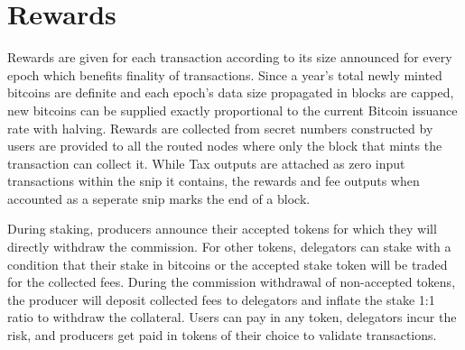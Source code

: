 \documentclass[a4paper,10pt]{article}
\begin{document}
\section{Rewards}

Rewards are given for each transaction according to its size  announced for every epoch which benefits finality of transactions. Since a year's total newly minted bitcoins are definite and each epoch's data size propagated in blocks are capped, new bitcoins can be supplied exactly proportional to the current Bitcoin issuance rate with halving. Rewards are collected from secret numbers constructed by users are provided to all the routed nodes where only the block that mints the transaction can collect it. While Tax outputs are attached as zero input transactions within the snip it contains, the rewards and fee outputs when accounted as a seperate snip marks the end of a block. 

During staking, producers announce their accepted tokens for which they will directly withdraw the commission. For other tokens, delegators can stake with a condition that their stake in bitcoins or the accepted stake token will be traded for the collected fees. During the commission withdrawal of non-accepted tokens, the producer will deposit collected fees to delegators and inflate the stake 1:1 ratio to withdraw the collateral. Users can pay in any token, delegators incur the risk, and producers get paid in tokens of their choice to validate transactions.
\end{document}
